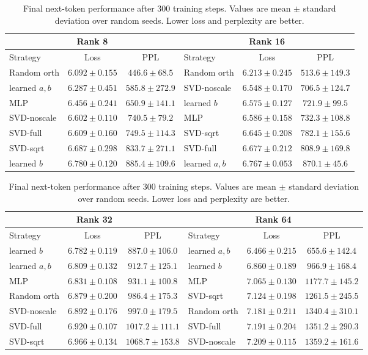 \begin{table}[h!]
\centering
\small
\begin{tabular}{lcc|lcc}
\multicolumn{3}{c|}{Rank 8} &
\multicolumn{3}{c}{Rank 16} \\
\hline
Strategy & Loss & PPL & Strategy & Loss & PPL \\
\hline
Random orth & $6.092 \pm 0.155$ & $446.6 \pm 68.5$ & Random orth & $6.213 \pm 0.245$ & $513.6 \pm 149.3$ \\
learned $a,b$ & $6.287 \pm 0.451$ & $585.8 \pm 272.9$ & SVD-noscale & $6.548 \pm 0.170$ & $706.5 \pm 124.7$ \\
MLP & $6.456 \pm 0.241$ & $650.9 \pm 141.1$ & learned $b$ & $6.575 \pm 0.127$ & $721.9 \pm 99.5$ \\
SVD-noscale & $6.602 \pm 0.110$ & $740.5 \pm 79.2$ & MLP & $6.586 \pm 0.158$ & $732.3 \pm 108.8$ \\
SVD-full & $6.609 \pm 0.160$ & $749.5 \pm 114.3$ & SVD-sqrt & $6.645 \pm 0.208$ & $782.1 \pm 155.6$ \\
SVD-sqrt & $6.687 \pm 0.298$ & $833.7 \pm 271.1$ & SVD-full & $6.677 \pm 0.212$ & $808.9 \pm 169.8$ \\
learned $b$ & $6.780 \pm 0.120$ & $885.4 \pm 109.6$ & learned $a,b$ & $6.767 \pm 0.053$ & $870.1 \pm 45.6$ \\
\end{tabular}

\vspace{0.7cm}

\begin{tabular}{lcc|lcc}
\multicolumn{3}{c|}{Rank 32} &
\multicolumn{3}{c}{Rank 64} \\
\hline
Strategy & Loss & PPL & Strategy & Loss & PPL \\
\hline
learned $b$ & $6.782 \pm 0.119$ & $887.0 \pm 106.0$ & learned $a,b$ & $6.466 \pm 0.215$ & $655.6 \pm 142.4$ \\
learned $a,b$ & $6.809 \pm 0.132$ & $912.7 \pm 125.1$ & learned $b$ & $6.860 \pm 0.189$ & $966.9 \pm 168.4$ \\
MLP & $6.831 \pm 0.108$ & $931.1 \pm 100.8$ & MLP & $7.065 \pm 0.130$ & $1177.7 \pm 145.2$ \\
Random orth & $6.879 \pm 0.200$ & $986.4 \pm 175.3$ & SVD-sqrt & $7.124 \pm 0.198$ & $1261.5 \pm 245.5$ \\
SVD-noscale & $6.892 \pm 0.176$ & $997.0 \pm 179.5$ & Random orth & $7.181 \pm 0.211$ & $1340.4 \pm 310.1$ \\
SVD-full & $6.920 \pm 0.107$ & $1017.2 \pm 111.1$ & SVD-full & $7.191 \pm 0.204$ & $1351.2 \pm 290.3$ \\
SVD-sqrt & $6.966 \pm 0.134$ & $1068.7 \pm 153.8$ & SVD-noscale & $7.209 \pm 0.115$ & $1359.2 \pm 161.6$ \\
\end{tabular}

\caption{Final next-token performance after 300 training steps. Values are mean $\pm$ standard deviation over random seeds. Lower loss and perplexity are better.}
\label{tab:stage5-ranked-final-eval-paired-ranks}
\end{table}
